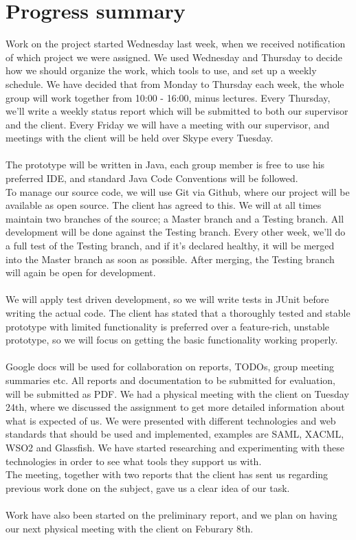 \documentclass[titlepage]{article}
\begin{document}
    \section*{Progress summary}
        Work on the project started Wednesday last week, when we received notification of which project we were assigned. We used Wednesday and Thursday to decide how we should organize the work, which tools to use, and set up a weekly schedule.
We have decided that from Monday to Thursday each week, the whole group will work together from 10:00 - 16:00, minus lectures. Every Thursday, we'll write a weekly status report which will be submitted to both our supervisor and the client. Every Friday we will have a meeting with our supervisor, and meetings with the client will be held over Skype every Tuesday.
\\\\
        The prototype will be written in Java, each group member is free to use his preferred IDE, and standard Java Code Conventions will be followed. 
\\To manage our source code, we will use Git via Github, where our project will be available as open source. The client has agreed to this. We will at all times maintain two branches of the source; a Master branch and a Testing branch. All development will be done against the Testing branch. Every other week, we'll do a full test of the Testing branch, and if it's declared healthy, it will be merged into the Master branch as soon as possible. After merging, the Testing branch will again be open for development.
\\\\
        We will apply test driven development, so we will write tests in JUnit before writing the actual code. The client has stated that a thoroughly tested and stable prototype with limited functionality is preferred over a feature-rich, unstable prototype, so we will focus on getting the basic functionality working properly.
\\\\
        Google docs will be used for collaboration on reports, TODOs, group meeting summaries etc. All reports and documentation to be submitted for evaluation, will be submitted as PDF.
We had a physical meeting with the client on Tuesday 24th, where we discussed the assignment to get more detailed information about what is expected of us. We were presented with different technologies and web standards that should be used and implemented, examples are SAML, XACML, WSO2 and Glassfish. We have started researching and experimenting with these technologies in order to see what tools they support us with. 
\\The meeting, together with two reports that the client has sent us regarding previous work done on the subject, gave us a clear idea of our task.
\\\\
        Work have also been started on the preliminary report, and we plan on having our next physical meeting with the client on Feburary 8th.
\end{document}
